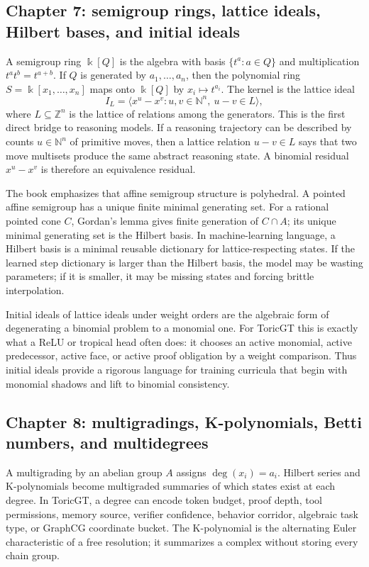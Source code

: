 \documentclass[11pt]{article}
\theoremstyle{definition}
\newcommand{\NN}{\mathbb{N}}
\newcommand{\ZZ}{\mathbb{Z}}
\newcommand{\kk}{\Bbbk}
\begin{document}
\subsection{Chapter 7: semigroup rings, lattice ideals, Hilbert bases, and initial ideals}
A semigroup ring \(\kk[Q]\) is the algebra with basis \(\{t^a:a\in Q\}\) and multiplication \(t^a t^b=t^{a+b}\).  If \(Q\) is generated by \(a_1,\ldots,a_n\), then the polynomial ring \(S=\kk[x_1,\ldots,x_n]\) maps onto \(\kk[Q]\) by \(x_i\mapsto t^{a_i}\).  The kernel is the lattice ideal
\[
I_L=\langle x^u-x^v: u,v\in \NN^n,\ u-v\in L\rangle,
\]
where \(L\subseteq \ZZ^n\) is the lattice of relations among the generators.  This is the first direct bridge to reasoning models.  If a reasoning trajectory can be described by counts \(u\in\NN^n\) of primitive moves, then a lattice relation \(u-v\in L\) says that two move multisets produce the same abstract reasoning state.  A binomial residual \(x^u-x^v\) is therefore an equivalence residual.

The book emphasizes that affine semigroup structure is polyhedral.  A pointed affine semigroup has a unique finite minimal generating set.  For a rational pointed cone \(C\), Gordan's lemma gives finite generation of \(C\cap A\); its unique minimal generating set is the Hilbert basis.  In machine-learning language, a Hilbert basis is a minimal reusable dictionary for lattice-respecting states.  If the learned step dictionary is larger than the Hilbert basis, the model may be wasting parameters; if it is smaller, it may be missing states and forcing brittle interpolation.

Initial ideals of lattice ideals under weight orders are the algebraic form of degenerating a binomial problem to a monomial one.  For ToricGT this is exactly what a ReLU or tropical head often does: it chooses an active monomial, active predecessor, active face, or active proof obligation by a weight comparison.  Thus initial ideals provide a rigorous language for training curricula that begin with monomial shadows and lift to binomial consistency.

\subsection{Chapter 8: multigradings, K-polynomials, Betti numbers, and multidegrees}
A multigrading by an abelian group \(A\) assigns \(\deg(x_i)=a_i\).  Hilbert series and K-polynomials become multigraded summaries of which states exist at each degree.  In ToricGT, a degree can encode token budget, proof depth, tool permissions, memory source, verifier confidence, behavior corridor, algebraic task type, or GraphCG coordinate bucket.  The K-polynomial is the alternating Euler characteristic of a free resolution; it summarizes a complex without storing every chain group.
\end{document}
